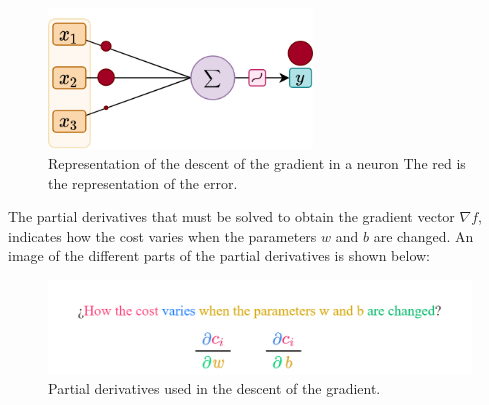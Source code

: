 \begin{itemize}
\begin{figure}[H]
    \centering
    \includegraphics[width=7cm]{images/state-of-art/gradient-descent/gradient_diagram.png}
    \caption{Representation of the descent of the gradient in a neuron The red is the representation of the error.}
    \label{fig:gradient_descent}
\end{figure}

The partial derivatives that must be solved to obtain the gradient vector $\nabla f$, indicates how the cost varies when the parameters $w$ and $b$ are changed. An image of the different parts of the partial derivatives is shown below:


\begin{figure}[H]
    \centering
    \includegraphics[width=13cm]{images/state-of-art/gradient-descent/dx.png}
    \caption{Partial derivatives used in the descent of the gradient.}
    \label{fig:gradient_descent}
\end{figure}

\end{itemize}


